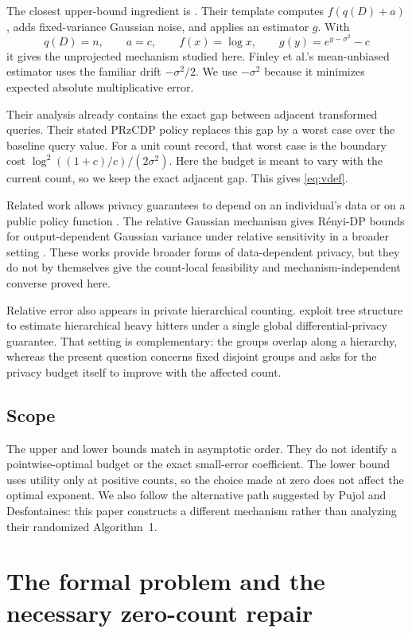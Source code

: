 \documentclass[11pt]{article}
\theoremstyle{definition}
\begin{document}
The closest upper-bound ingredient is \citet{FinleyEtAl2026}. Their template computes $f(q(D)+a)$, adds fixed-variance Gaussian noise, and applies an estimator $g$. With
\[
  q(D)=n,\qquad a=c,\qquad f(x)=\log x,
  \qquad g(y)=e^{y-\sigma^2}-c
\]
it gives the unprojected mechanism studied here. Finley et al.'s mean-unbiased estimator uses the familiar drift $-\sigma^2/2$. We use $-\sigma^2$ because it minimizes expected absolute multiplicative error.

Their analysis already contains the exact gap between adjacent transformed queries. Their stated PRzCDP policy replaces this gap by a worst case over the baseline query value. For a unit count record, that worst case is the boundary cost $\log^2((1+c)/c)/(2\sigma^2)$. Here the budget is meant to vary with the current count, so we keep the exact adjacent gap. This gives \eqref{eq:vdef}.

Related work allows privacy guarantees to depend on an individual's data or on a public policy function \citep{LuiPass2015,SeemanEtAl2024}. The relative Gaussian mechanism gives R\'enyi-DP bounds for output-dependent Gaussian variance under relative sensitivity in a broader setting \citep{HendrikxEtAl2024}. These works provide broader forms of data-dependent privacy, but they do not by themselves give the count-local feasibility and mechanism-independent converse proved here.

Relative error also appears in private hierarchical counting. \citet{BiswasEtAl2024} exploit tree structure to estimate hierarchical heavy hitters under a single global differential-privacy guarantee. That setting is complementary: the groups overlap along a hierarchy, whereas the present question concerns fixed disjoint groups and asks for the privacy budget itself to improve with the affected count.

\subsection{Scope}

The upper and lower bounds match in asymptotic order. They do not identify a pointwise-optimal budget or the exact small-error coefficient. The lower bound uses utility only at positive counts, so the choice made at zero does not affect the optimal exponent. We also follow the alternative path suggested by Pujol and Desfontaines: this paper constructs a different mechanism rather than analyzing their randomized Algorithm~1.

\section{The formal problem and the necessary zero-count repair}
\label{sec:problem}
\end{document}
